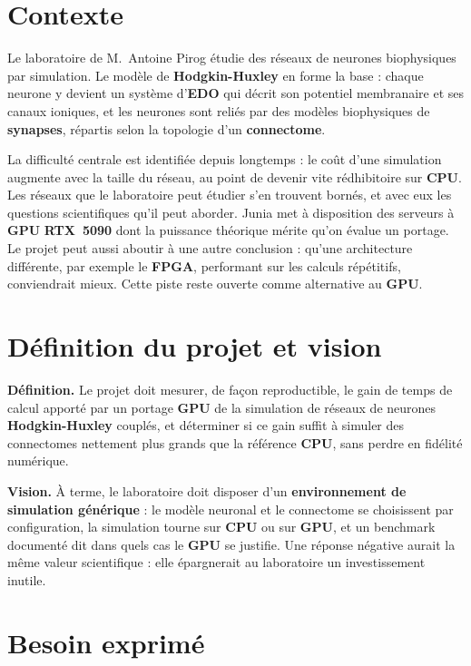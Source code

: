 \section{Contexte}

Le laboratoire de M.~Antoine Pirog étudie des réseaux de neurones biophysiques par simulation. Le modèle de \textbf{Hodgkin-Huxley} en forme la base : chaque neurone y devient un système d'\textbf{EDO} qui décrit son potentiel membranaire et ses canaux ioniques, et les neurones sont reliés par des modèles biophysiques de \textbf{synapses}, répartis selon la topologie d'un \textbf{connectome}.

La difficulté centrale est identifiée depuis longtemps : le coût d'une simulation augmente avec la taille du réseau, au point de devenir vite rédhibitoire sur \textbf{CPU}. Les réseaux que le laboratoire peut étudier s'en trouvent bornés, et avec eux les questions scientifiques qu'il peut aborder. Junia met à disposition des serveurs à \textbf{GPU} \textbf{RTX~5090} dont la puissance théorique mérite qu'on évalue un portage. Le projet peut aussi aboutir à une autre conclusion : qu'une architecture différente, par exemple le \textbf{FPGA}, performant sur les calculs répétitifs, conviendrait mieux. Cette piste reste ouverte comme alternative au \textbf{GPU}.

\section{Définition du projet et vision}

\textbf{Définition.} Le projet doit mesurer, de façon reproductible, le gain de temps de calcul apporté par un portage \textbf{GPU} de la simulation de réseaux de neurones \textbf{Hodgkin-Huxley} couplés, et déterminer si ce gain suffit à simuler des connectomes nettement plus grands que la référence \textbf{CPU}, sans perdre en fidélité numérique.

\textbf{Vision.} À terme, le laboratoire doit disposer d'un \textbf{environnement de simulation générique} : le modèle neuronal et le connectome se choisissent par configuration, la simulation tourne sur \textbf{CPU} ou sur \textbf{GPU}, et un benchmark documenté dit dans quels cas le \textbf{GPU} se justifie. Une réponse négative aurait la même valeur scientifique : elle épargnerait au laboratoire un investissement inutile.

\section{Besoin exprimé}

